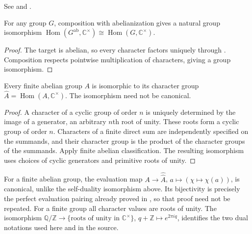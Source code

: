 See  and
.

\begin{proposition}\label{characters-abelianization}
For any group $G$, composition with abelianization gives a natural
group isomorphism
$\operatorname{Hom}(G^{\mathrm{ab}},\mathbb C^\times)
\cong\operatorname{Hom}(G,\mathbb C^\times)$.
\end{proposition}
\begin{proof}\label{characters-abelianization-proof}
The target is abelian, so every character factors uniquely through
. Composition respects pointwise
multiplication of characters, giving a group isomorphism.
\end{proof}
\begin{proposition}\label{finite-self-duality}
Every finite abelian group $A$ is isomorphic to its character group
$\widehat A=\operatorname{Hom}(A,\mathbb C^\times)$. The isomorphism
need not be canonical.
\end{proposition}
\begin{proof}\label{finite-self-duality-proof}
A character of a cyclic group of order $n$ is uniquely determined
by the image of a generator, an arbitrary $n$th root of unity.
These roots form a cyclic group of order $n$.
Characters of a finite direct sum are independently specified on
the summands, and their character group is the product of the
character groups of the summands. Apply finite abelian classification.
The resulting isomorphism uses choices of cyclic generators and
primitive roots of unity.
\end{proof}
\begin{remark}\label{double-dual-canonical}
For a finite abelian group, the evaluation map
$A\to\widehat{\widehat A}$, $a\mapsto(\chi\mapsto\chi(a))$, is
canonical, unlike the self-duality isomorphism above. Its bijectivity
is precisely the perfect evaluation pairing already proved in
, so that proof need
not be repeated. For a finite group all character values are roots
of unity. The isomorphism
$\mathbb Q/\mathbb Z\to\{\text{roots of unity in }\mathbb C^\times\}$,
$q+\mathbb Z\mapsto e^{2\pi iq}$, identifies the two dual notations
used here and in the source.
\end{remark}
